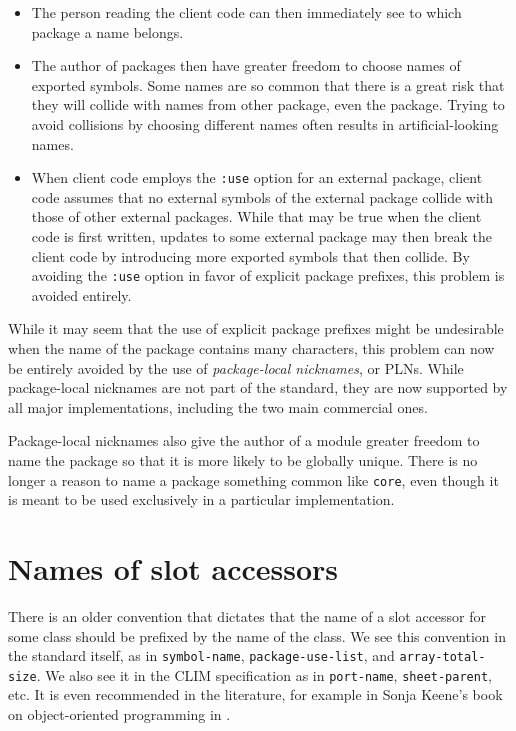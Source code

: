\begin{itemize}
\item The person reading the client code can then immediately see to
  which package a name belongs.
\item The author of packages then have greater freedom to choose names
  of exported symbols.  Some names are so common that there is a great
  risk that they will collide with names from other package, even the
  \commonlisp{} package.  Trying to avoid collisions by choosing
  different names often results in artificial-looking names.
\item When client code employs the \texttt{:use} option for an
  external package, client code assumes that no external symbols of
  the external package collide with those of other external packages.
  While that may be true when the client code is first written,
  updates to some external package may then break the client code by
  introducing more exported symbols that then collide.  By avoiding
  the \texttt{:use} option in favor of explicit package prefixes, this
  problem is avoided entirely.
\end{itemize}

While  it may seem that the use of explicit package prefixes might be
undesirable when the name of the package contains many characters,
this problem can now be entirely avoided by the use of
\emph{package-local nicknames}, or PLNs.  While package-local
nicknames are not part of the \commonlisp{} standard, they are now
supported by all major \commonlisp{} implementations, including the
two main commercial ones.

Package-local nicknames also give the author of a module greater
freedom to name the package so that it is more likely to be globally
unique.  There is no longer a reason to name a package something
common like \texttt{core}, even though it is meant to be used
exclusively in a particular implementation.

\section{Names of slot accessors}

There is an older convention that dictates that the name of a slot
accessor for some class should be prefixed by the name of the class.
We see this convention in the \commonlisp{} standard itself, as in
\texttt{symbol-name}, \texttt{package-use-list}, and
\texttt{array-total-size}.  We also see it in the CLIM
specification as in \texttt{port-name}, \texttt{sheet-parent}, etc.
It is even recommended in the literature, for example in Sonja Keene's
book on object-oriented programming in \commonlisp{}
\cite{sonya-keene}.

